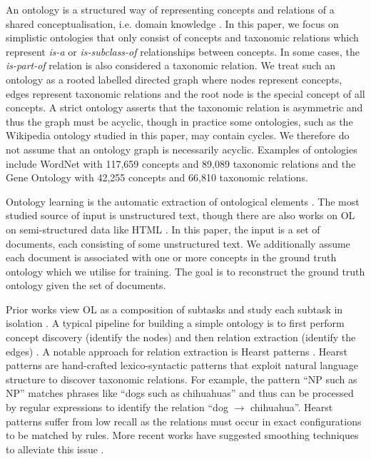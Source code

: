 \documentclass{article}
\begin{document}
An ontology is a structured way of representing concepts and relations of a shared conceptualisation, i.e. domain knowledge \cite{gruber1995toward,gruber1993translation}. In this paper, we focus on simplistic ontologies that only consist of concepts and taxonomic relations which represent \emph{is-a} or \emph{is-subclass-of} relationships between concepts. In some cases, the \emph{is-part-of} relation is also considered a taxonomic relation. We treat such an ontology as a rooted labelled directed graph where nodes represent concepts, edges represent taxonomic relations and the root node is the special concept of all concepts. A strict ontology asserts that the taxonomic relation is asymmetric and thus the graph must be acyclic, though in practice some ontologies, such as the Wikipedia ontology studied in this paper, may contain cycles. We therefore do not assume that an ontology graph is necessarily acyclic. Examples of ontologies include WordNet \cite{miller1995wordnet} with 117,659 concepts and 89,089 taxonomic relations and the Gene Ontology \cite{ashburner2000gene} with 42,255 concepts and 66,810 taxonomic relations.

Ontology learning is the automatic extraction of ontological elements \cite{hazman2011survey}. The most studied source of input is unstructured text, though there are also works on OL on semi-structured data like HTML \cite{karoui2004ontology}. In this paper, the input is a set of documents, each consisting of some unstructured text. We additionally assume each document is associated with one or more concepts in the ground truth ontology which we utilise for training. The goal is to reconstruct the ground truth ontology given the set of documents.

Prior works view OL as a composition of subtasks and study each subtask in isolation \cite{buitelaar2005ontology,asim2018survey}. A typical pipeline for building a simple ontology is to first perform concept discovery (identify the nodes) and then relation extraction (identify the edges) \cite{cimiano2005text2onto,kaushik2018automatic}. A notable approach for relation extraction is Hearst patterns \cite{hearst1998automated}. Hearst patterns are hand-crafted lexico-syntactic patterns that exploit natural language structure to discover taxonomic relations. For example, the pattern ``NP such as NP'' matches phrases like ``dogs such as chihuahuas'' and thus can be processed by regular expressions to identify the relation ``dog $\to$ chihuahua''. Hearst patterns suffer from low recall as the relations must occur in exact configurations to be matched by rules. More recent works have suggested smoothing techniques to alleviate this issue \cite{roller2018hearst}.
\end{document}
